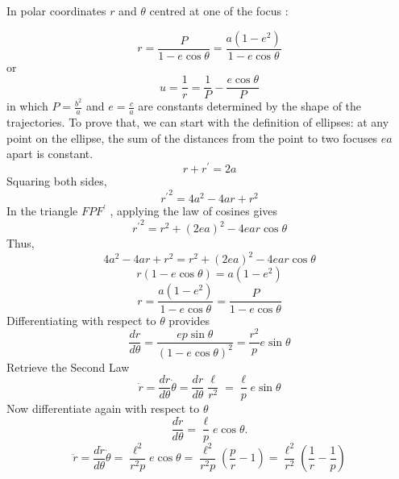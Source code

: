 \documentclass{article}
\begin{document}
In polar coordinates $r$ and $\theta$ centred at one of the focus :

\[r = \frac{P}{1 - e\cos{\theta}} = \frac{a(1 - e^2)}{1 - e\cos{\theta}}\]
or
\[u = \frac{1}{r} = \frac{1}{P} - \frac{e\cos{\theta}}{P}\]
in which $P=\frac{b^2}{a}$ and $e = \frac{c}{a}$ are constants determined by the shape of the trajectories.
To prove that, we  can start with the definition of ellipses: at any point on the ellipse, the sum of the distances from the point to two focuses $ea$ apart is constant.
\[r + r^\prime = 2a\]
Squaring both sides,
\[{r^\prime} ^ 2 = 4a^2 - 4ar + r^2\]
In the triangle $FPF^\prime$ , applying the law of cosines gives
\[{r^\prime} ^ 2 = r^2 +(2ea)^2 - 4ear\cos{\theta}\]
Thus,
\[4a^2 - 4ar + r^2 = r^2 +(2ea)^2 - 4ear\cos{\theta}\]
\[r(1-e\cos{\theta}) = a(1 - e^2)\]
\[r = \frac{a(1 - e^2)}{1- e\cos{\theta}} = \frac{P}{1 - e\cos{\theta}}\]
Differentiating with respect to $\theta$ provides
\[\frac{dr}{d\theta} = \frac{ep \sin{\theta}}{(1-e \cos{\theta})^2} = \frac{r^2}{p} e \sin{\theta}\]
Retrieve the Second Law
\[\dot r = \frac{dr}{d\theta} \dot \theta = \frac{dr}{d\theta} \frac{\ell}{r^2} = \frac{\ell}{p} e \sin{\theta}\]
Now differentiate again with respect to $\theta$
\[\frac{d\dot r}{d\theta} = \frac{\ell}{p} e \cos{\theta}.\]
\begin{equation*}
    \ddot r = \frac{d \dot r}{d \theta} \dot \theta = \frac{\ell^2}{ r^2 p} e\cos{\theta} = \frac{\ell^2}{r^2 p} \left( \frac{p}{r}-1 \right) = \frac{\ell^2}{r^2} \left( \frac{1}{r}-\frac{1}{p}\right)
    \label{r double dot}
\end{equation*}
    
\end{document}
